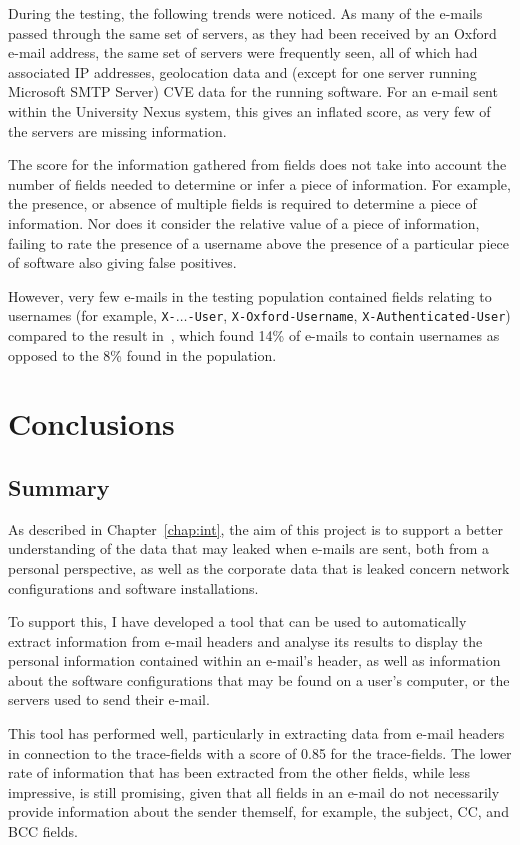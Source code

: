 During the testing, the following trends were noticed.  As many of the e-mails
passed through the same set of servers, as they had been received by an Oxford
e-mail address, the same set of servers were frequently seen, all of which had
associated IP addresses, geolocation data and (except for one server running
Microsoft SMTP Server) CVE data for the running software.  For an e-mail sent
within the University Nexus system, this gives an inflated score, as very few
of the servers are missing information.

The score for the information gathered from fields does not take into account
the number of fields needed to determine or infer a piece of information. For
example, the presence, or absence of multiple fields is required to determine a
piece of information.  Nor does it consider the relative value of a piece of
information, failing to rate the presence of a username above the presence of a
particular piece of software also giving false positives.

However, very few e-mails in the testing population contained fields relating
to usernames (for example, \texttt{X-}$\ldots$\texttt{-User}, \texttt{X-Oxford-Username},
\texttt{X-Authenticated-User}) compared to the result
in~\cite{nurse2015investigating}, which found 14\% of e-mails to contain
usernames as opposed to the 8\% found in the population.

\cleardoublepage \chapter{Conclusions}
\section{Summary}

As described in Chapter~\ref{chap:int}, the aim of this project is to support a
better understanding of the data that may leaked when e-mails are sent, both
from a personal perspective, as well as the corporate data that is leaked
concern network configurations and software installations.

To support this, I have developed a tool that can be used to automatically
extract information from e-mail headers and analyse its results to display the
personal information contained within an e-mail's header, as well as
information about the software configurations that may be found on a user's
computer, or the servers used to send their e-mail.

This tool has performed well, particularly in extracting data from e-mail
headers in connection to the trace-fields with a score of 0.85 for the
trace-fields.  The lower rate of information that has been extracted from
the other fields, while less impressive, is still promising, given that all
fields in an e-mail do not necessarily provide information about the sender
themself, for example, the subject, CC, and BCC fields.

